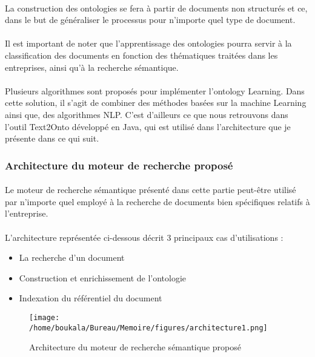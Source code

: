 \documentclass[12pt, a4paper, oneside]{book}
\begin{document}
\paragraph{}
La construction des ontologies se fera à partir de documents non structurés et ce, dans le but de généraliser le processus pour n'importe quel type de document.
\paragraph{}
Il est important de noter que l'apprentissage des ontologies pourra servir à la classification des documents en fonction des thématiques traitées dans les entreprises, ainsi qu'à la recherche sémantique.
\paragraph{}
Plusieurs algorithmes sont proposés pour implémenter l'ontology Learning. 
Dans cette solution, il s'agit de combiner des méthodes basées sur la machine Learning ainsi que, des algorithmes NLP. C'est d'ailleurs ce que nous retrouvons dans l'outil Text2Onto développé en Java, qui est utilisé dans l'architecture que je présente dans ce qui suit.

\subsubsection{Architecture du moteur de recherche proposé}
\paragraph{}
Le moteur de recherche sémantique présenté dans cette partie peut-être utilisé par n'importe quel employé à la recherche de documents bien spécifiques relatifs à l'entreprise.
\paragraph{}
L'architecture représentée ci-dessous décrit 3 principaux cas d'utilisations :
\begin{itemize}
\item La recherche d'un document
\item Construction et enrichissement de l'ontologie
\item Indexation du référentiel du document
\end{itemize}


\begin{figure}[h!]
\begin{center}
\texttt{[image: /home/boukala/Bureau/Memoire/figures/architecture1.png]}
\caption{Architecture du moteur de recherche sémantique proposé}
\end{center}
\end{figure}
\end{document}
